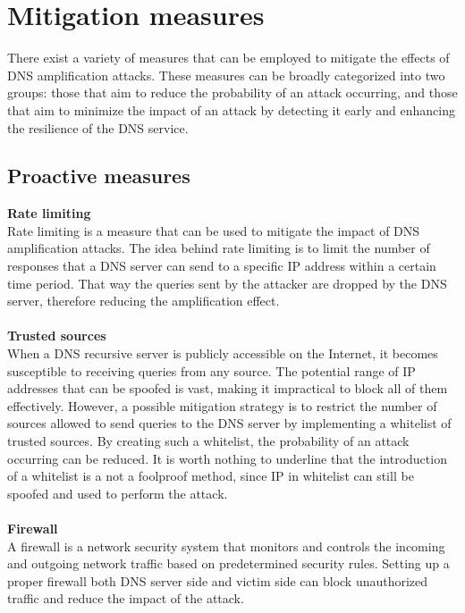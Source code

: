 \section{Mitigation measures}
There exist a variety of measures that can be employed to mitigate the effects of DNS amplification attacks. 
These measures can be broadly categorized into two groups: those that aim to reduce the probability of an attack occurring, and 
those that aim to minimize the impact of an attack by detecting it early and enhancing the resilience of the DNS service.

\subsection{Proactive measures}
\textbf{Rate limiting}\\
Rate limiting is a measure that can be used to mitigate the impact of DNS amplification attacks. The idea behind rate limiting is to limit 
the number of responses that a DNS server can send to a specific IP address within a certain time period. That way the queries sent
by the attacker are dropped by the DNS server, therefore reducing the amplification effect.\\
\\
\textbf{Trusted sources}\\
When a DNS recursive server is publicly accessible on the Internet, it becomes susceptible to receiving queries from any source. 
The potential range of IP addresses that can be spoofed is vast, making it impractical to block all of them effectively. However, a 
possible mitigation strategy is to restrict the number of sources allowed to send queries to the DNS server by implementing a whitelist of trusted 
sources. By creating such a whitelist, the probability of an attack occurring can be reduced. It is worth nothing to underline that 
the introduction of a whitelist is a not a foolproof method, since IP in whitelist can still be spoofed and used to perform the attack.\\
\\
\textbf{Firewall}\\
A firewall is a network security system that monitors and controls the incoming and outgoing network traffic based on predetermined security
rules. Setting up a proper firewall both DNS server side and victim side can block unauthorized traffic and reduce the impact of the attack.

